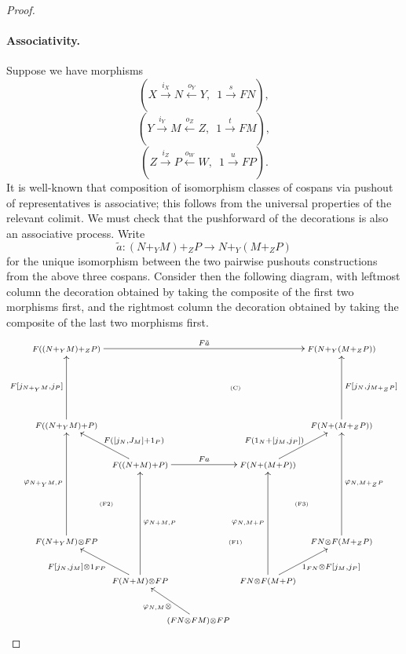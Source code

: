 \begin{proof}
\paragraph{Associativity.}
Suppose we have morphisms
\[
  (X \stackrel{i_X}\longrightarrow N \stackrel{o_Y}\longleftarrow Y,\enspace 1
  \stackrel{s}\longrightarrow FN),
\]
\[
  (Y \stackrel{i_Y}\longrightarrow M \stackrel{o_Z}\longleftarrow Z,\enspace 1
  \stackrel{t}\longrightarrow FM), 
\]
\[
  (Z \stackrel{i_Z}\longrightarrow P \stackrel{o_W}\longleftarrow W,\enspace 1
  \stackrel{u}\longrightarrow FP).
\]
It is well-known that composition of isomorphism classes of cospans via
pushout of representatives is associative; this follows from the universal
properties of the relevant colimit. We must check that the pushforward of the
decorations is also an associative process. Write 
\[
  \tilde a\colon  (N+_YM)+_ZP \longrightarrow N+_Y(M+_ZP)
\]
for the unique isomorphism between the two pairwise pushouts constructions
from the above three cospans. Consider then the following diagram, with leftmost
column the decoration obtained by taking the composite of the first two morphisms
first, and the rightmost column the decoration obtained by taking the composite
of the last two morphisms first.
\[
  \xymatrixcolsep{-.6pc}
  \xymatrix{ 
    \scriptstyle F((N+_YM)+_ZP) \ar[rrrrrrrr]^{F\tilde a} &&&&&&&&
    \scriptstyle F(N+_Y(M+_ZP)) \\
    &&&& \textrm{\tiny(C)} \\
    \scriptstyle F((N+_YM)+P) \ar[uu]^{F[j_{N+_YM},j_P]} &&&&&&&& \scriptstyle
    F(N+(M+_ZP)) \ar[uu]_{F[j_N,j_{M+_ZP}]} \\
    && \scriptstyle F((N+M)+P) \ar[ull]_(.35)*+<6pt>_{\scriptstyle F([j_N,J_M]+1_P)}
    \ar[rrrr]^{Fa} &&&& \scriptstyle F(N+(M+P))
    \ar[urr]^(.35)*+<6pt>^{\scriptstyle F(1_N+[j_M,j_P])} \\
    & \textrm{\tiny(F2)} &&&&&& \textrm{\tiny(F3)} \\
    \scriptstyle F(N+_YM)\otimes FP \ar[uuu]^{\varphi_{N+_YM,P}} &&&& 
    \textrm{\tiny(F1)} &&&& \scriptstyle FN\otimes F(M+_ZP)
    \ar[uuu]_{\varphi_{N,M+_ZP}} \\
    && \scriptstyle F(N+M)\otimes FP \ar[ull]^(.6)*+<6pt>^{\scriptstyle
      F[j_N,j_M] \otimes 1_{FP}} \ar[uuu]_{\varphi_{N+M,P}} &&&& \scriptstyle
      FN \otimes F(M+P) \ar[urr]_(.6)*+<6pt>_{\scriptstyle 1_{FN} \otimes
    F[j_M,j_P]} \ar[uuu]^{\varphi_{N,M+P}} \\
    &&& \scriptstyle (FN \otimes FM) \otimes FP \ar[ul]^{\varphi_{N,M} \otimes
}}\]
\end{proof}
